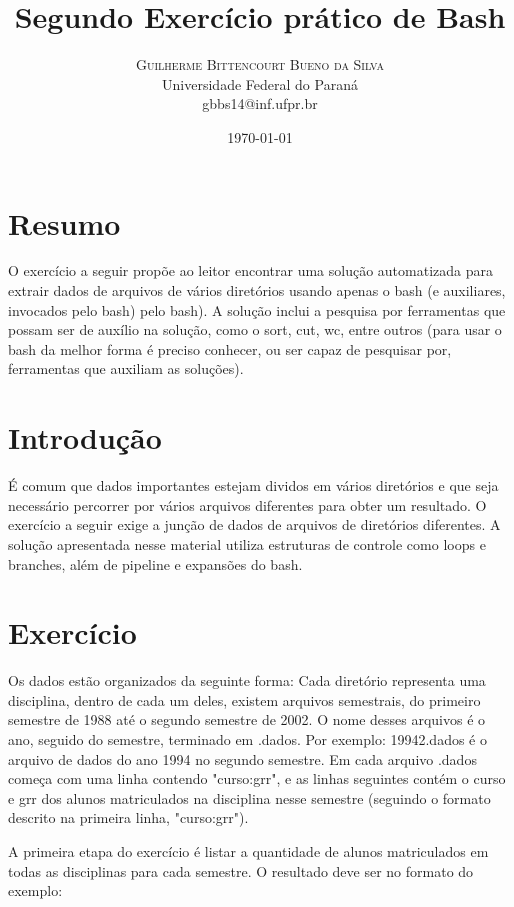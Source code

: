 \documentclass[oneside, 11 pt]{article}
\title{Segundo Exercício prático de Bash} %
\author{%
	\textsc{Guilherme Bittencourt Bueno da Silva} \\[1ex] %
	\normalsize Universidade Federal do Paraná \\ %
	\normalsize {gbbs14@inf.ufpr.br} %
}
\date{\today} %
\begin{document}
	
	\maketitle
	
	\section{Resumo}
	O exercício a seguir propõe ao leitor encontrar uma solução automatizada para extrair dados de arquivos de vários diretórios usando apenas o bash (e auxiliares, invocados pelo bash)
	pelo bash). A solução inclui a pesquisa por ferramentas que possam ser de auxílio na
	solução, como o sort, cut, wc, entre outros (para usar o bash da melhor forma é preciso
	conhecer, ou ser capaz de pesquisar por, ferramentas que auxiliam as soluções).
	
	\section{Introdução}
	É comum que dados importantes estejam dividos em vários diretórios e que seja necessário percorrer por vários arquivos diferentes para obter um resultado. O exercício a seguir exige a junção de dados de arquivos de diretórios diferentes. A solução apresentada nesse material utiliza estruturas de controle como loops e branches, além de pipeline e expansões do bash.
	
	\section{Exercício}
	Os dados estão organizados da seguinte forma: Cada diretório representa uma disciplina, dentro de cada um deles, existem arquivos semestrais, do primeiro semestre de 1988 até o segundo semestre de 2002. O nome desses arquivos é o ano, seguido do semestre, terminado em .dados. Por exemplo: 19942.dados é o arquivo de dados do ano 1994 no segundo semestre. Em cada arquivo .dados começa com uma linha contendo "curso:grr", e as linhas seguintes contém o curso e grr dos alunos matriculados na disciplina nesse semestre (seguindo o formato descrito na primeira linha, "curso:grr").
	
	A primeira etapa do exercício é listar a quantidade de alunos matriculados em todas as disciplinas para cada semestre. O resultado deve ser no formato do exemplo: 
	
\end{document}
